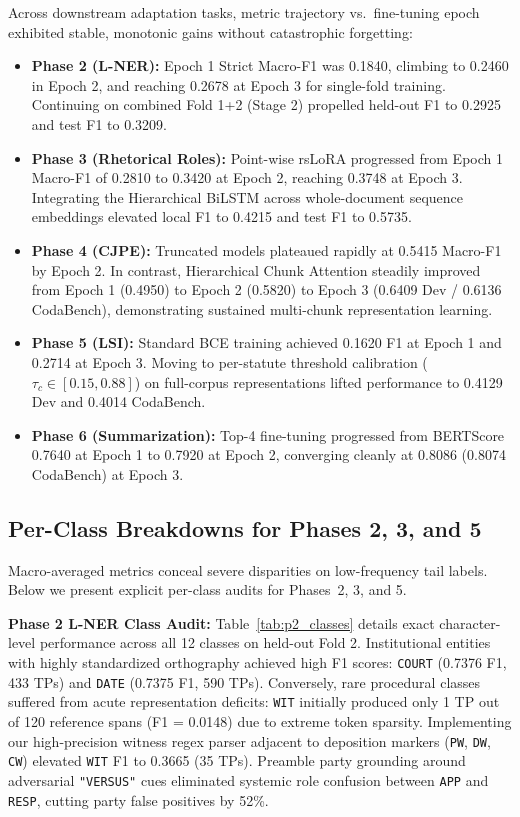 \documentclass[11pt, oneside]{article}
\begin{document}
Across downstream adaptation tasks, metric trajectory vs.\ fine-tuning epoch exhibited stable, monotonic gains without catastrophic forgetting:
\begin{itemize}
    \item \textbf{Phase 2 (L-NER):} Epoch 1 Strict Macro-F1 was 0.1840, climbing to 0.2460 in Epoch 2, and reaching 0.2678 at Epoch 3 for single-fold training. Continuing on combined Fold 1+2 (Stage 2) propelled held-out F1 to 0.2925 and test F1 to 0.3209.
    \item \textbf{Phase 3 (Rhetorical Roles):} Point-wise rsLoRA progressed from Epoch 1 Macro-F1 of 0.2810 to 0.3420 at Epoch 2, reaching 0.3748 at Epoch 3. Integrating the Hierarchical BiLSTM across whole-document sequence embeddings elevated local F1 to 0.4215 and test F1 to 0.5735.
    \item \textbf{Phase 4 (CJPE):} Truncated models plateaued rapidly at 0.5415 Macro-F1 by Epoch 2. In contrast, Hierarchical Chunk Attention steadily improved from Epoch 1 (0.4950) to Epoch 2 (0.5820) to Epoch 3 (0.6409 Dev / 0.6136 CodaBench), demonstrating sustained multi-chunk representation learning.
    \item \textbf{Phase 5 (LSI):} Standard BCE training achieved 0.1620 F1 at Epoch 1 and 0.2714 at Epoch 3. Moving to per-statute threshold calibration ($\tau_c \in [0.15, 0.88]$) on full-corpus representations lifted performance to 0.4129 Dev and 0.4014 CodaBench.
    \item \textbf{Phase 6 (Summarization):} Top-4 fine-tuning progressed from BERTScore 0.7640 at Epoch 1 to 0.7920 at Epoch 2, converging cleanly at 0.8086 (0.8074 CodaBench) at Epoch 3.
\end{itemize}

\subsection{Per-Class Breakdowns for Phases 2, 3, and 5}
Macro-averaged metrics conceal severe disparities on low-frequency tail labels. Below we present explicit per-class audits for Phases~2, 3, and 5.

\noindent
\textbf{Phase 2 L-NER Class Audit:} Table~\ref{tab:p2_classes} details exact character-level performance across all 12 classes on held-out Fold 2. Institutional entities with highly standardized orthography achieved high F1 scores: \texttt{COURT} (0.7376 F1, 433 TPs) and \texttt{DATE} (0.7375 F1, 590 TPs). Conversely, rare procedural classes suffered from acute representation deficits: \texttt{WIT} initially produced only 1 TP out of 120 reference spans (F1 = 0.0148) due to extreme token sparsity. Implementing our high-precision witness regex parser adjacent to deposition markers (\texttt{PW}, \texttt{DW}, \texttt{CW}) elevated \texttt{WIT} F1 to 0.3665 (35 TPs). Preamble party grounding around adversarial \texttt{"VERSUS"} cues eliminated systemic role confusion between \texttt{APP} and \texttt{RESP}, cutting party false positives by 52\%.
\end{document}
